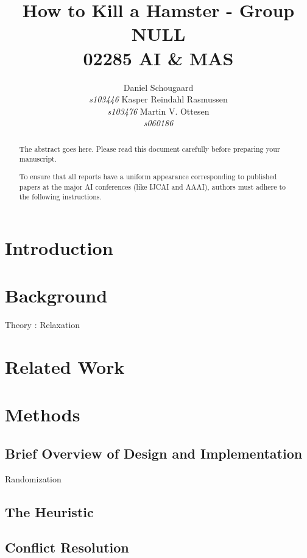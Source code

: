 \documentclass[letterpaper]{article}
\begin{document}
\title{How to Kill a Hamster - Group NULL\\ 02285 AI \& MAS}

\author{
	Daniel Schougaard \\ \textit{s103446} \And 
	Kasper Reindahl Rasmussen\\ \textit{s103476} \And 
	Martin V. Ottesen\\ \textit{s060186}  }
\maketitle



\begin{abstract}
The abstract goes here. Please read this document carefully before preparing your manuscript.

To ensure that all reports have a uniform appearance corresponding to published papers at the major AI conferences (like IJCAI and AAAI), authors must adhere to the following instructions. 
\end{abstract}

\section{Introduction}

\section{Background}
	Theory : Relaxation

\section{Related Work}

\section{Methods}
	\subsection{Brief Overview of Design and Implementation}
		Randomization
	\subsection{The Heuristic}
	\subsection{Conflict Resolution}
\end{document}
